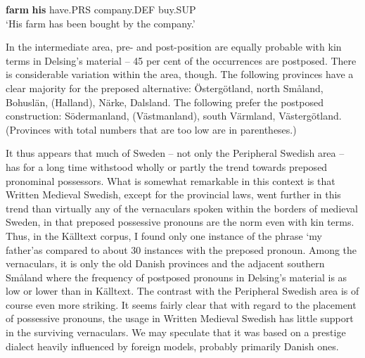 \textbf{farm} \textbf{his} have.PRS  company.DEF  buy.SUP\\ %


‘His farm has been bought by the company.’
\z


In the intermediate area, pre- and post-position are equally probable with kin terms in Delsing’s material – 45 per cent of the occurrences are postposed. There is considerable variation within the area, though. The following provinces have a clear majority for the preposed alternative: Östergötland, north Småland, Bohuslän, (Halland), Närke, Dalsland. The following prefer the postposed construction: Södermanland, (Västmanland), south Värmland, Västergötland. (Provinces with total numbers that are too low are in parentheses.)

It thus appears that much of Sweden – not only the Peripheral Swedish area – has for a long time withstood wholly or partly the trend towards preposed pronominal possessors. What is somewhat remarkable in this context is that Written Medieval Swedish, except for the provincial laws, went further in this trend than virtually any of the vernaculars spoken within the borders of medieval Sweden, in that preposed possessive pronouns are the norm even with kin terms. Thus, in the Källtext corpus, I found only one instance of the phrase ‘my father’\textstyleLinguisticExample{ }as compared to about 30 instances with the preposed pronoun. Among the vernaculars, it is only the old Danish provinces and the adjacent southern Småland where the frequency of postposed pronouns in Delsing’s material is as low or lower than in Källtext. The contrast with the Peripheral Swedish area is of course even more striking. It seems fairly clear that with regard to the placement of possessive pronouns, the usage in Written Medieval Swedish has little support in the surviving vernaculars. We may speculate that it was based on a prestige dialect heavily influenced by foreign models, probably primarily Danish ones.

\clearpage%
 

